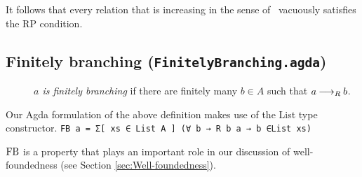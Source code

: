 \begin{remark}
    It follows that every relation that is increasing in the sense of \terese $\,$ vacuously satisfies the RP condition.
\end{remark}

\subsection{Finitely branching (\texttt{FinitelyBranching.agda})}

\begin{definition} \hfill
    \begin{description}
        \item[] \emph{$a$ is finitely branching} if there are finitely many $b \in A$ such that $a \mathbin{\longrightarrow_R} b$.
    \end{description}
\end{definition}

Our Agda formulation of the above definition makes use of the List type constructor.
\verb|FB a = Σ[ xs ∈ List A ] (∀ b → R b a → b ∈List xs)|

$\mathrm{FB}$ is a property that plays an important role in our discussion of well-foundedness (see Section \ref{sec:Well-foundedness}).
